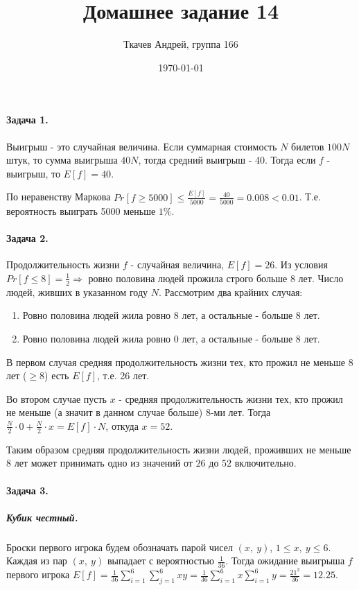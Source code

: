 \documentclass{article}
\title{Домашнее задание 14}
\author{Ткачев Андрей, группа 166}
\date{\today}
\newcommand{\pair}[2]{(#1,\ #2)}
\newcommand{\half}[1]{\frac{#1}{2}}
\begin{document}
	\maketitle
	\paragraph{Задача 1.}

    Выигрыш - это случайная величина. Если суммарная стоимость $N$ билетов $100N$ штук, то сумма выигрыша $40N$, тогда средний выигрыш - 40. Тогда если $f$ - выигрыш, то $E[f] = 40$.

    По неравенству Маркова $Pr[f \ge 5000] \le \frac{E[f]}{5000} = \frac{40}{5000} = 0.008 < 0.01 $. Т.е. вероятность выиграть 5000 меньше $1\%$.

    \paragraph{Задача 2.}
    Продолжительность жизни $f$ - случайная величина, $E[f] = 26$. Из условия $Pr[f \le 8] = \half{1} \Rightarrow$ ровно половина людей прожила строго больше 8 лет.
    Число людей, живших в указанном году $N$. Рассмотрим два крайних случая:

    \begin{enumerate}
        \item Ровно половина людей жила ровно 8 лет, а остальные - больше 8 лет.
        \item Ровно половина людей жила ровно 0 лет, а остальные - больше 8 лет.
    \end{enumerate}

    В первом случая средняя продолжительность жизни тех, кто прожил не меньше 8 лет ($\ge 8$) есть $E[f]$, т.е. 26 лет.

    Во втором случае пусть $x$ - средняя продолжительность жизни тех, кто прожил не меньше (а значит в данном случае больше) 8-ми лет. Тогда $\half{N} \cdot 0  + \half{N} \cdot x = E[f] \cdot N$, откуда $x = 52$.

    Таким образом средняя продолжительность жизни людей, проживших не меньше 8 лет может принимать одно из значений от $26$ до $52$ включительно.

    \paragraph{Задача 3.}
    \subparagraph{Кубик честный.}
    Броски первого игрока будем обозначать парой чисел $(x,\ y)$, $1 \le x,\ y \le 6$. Каждая из пар $\pair{x}{y}$ выпадает с вероятностью $\frac{1}{36}$. Тогда ожидание выигрыша $f$ первого игрока $E[f] = \frac{1}{36}\sum_{i=1}^{6}\sum_{j=1}^{6} xy = \frac{1}{36} \sum_{i=1}^{6} x \sum_{i=1}^{6} y = \frac{21^2}{36} = 12.25$.
\end{document}
